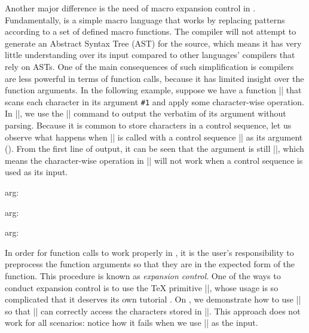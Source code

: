 \documentclass{ltugboat}
\begin{document}
Another major difference is the need of macro expansion control in \LT{}.
Fundamentally, \LT{} is a simple macro language that works by replacing patterns according to a set of defined macro functions.
The \LT{} compiler will not attempt to generate an Abstract Syntax Tree (AST) for the \LT{} source, which means it has very little understanding over its input compared to other languages' compilers that rely on ASTs.
One of the main consequences of such simplification is \LT{} compilers are less powerful in terms of function calls, because it has limited insight over the function arguments.
In the following example, suppose we have a function \inltex|\cmda| that scans each character in its argument \verb|#1| and apply some character-wise operation. 
In \inltex|\cmda|, we use the \inltex|\detokenize| command to output the verbatim of its argument without parsing.
Because it is common to store characters in a control sequence, let us observe what happens when \inltex|\cmda| is called with a control sequence \inltex|\vala| as its argument ().
From the first line of output, it can be seen that the argument is still \inltex|\vala|, which means the character-wise operation in \inltex|\cmda| will not work when a control sequence is used as its input.
\begin{latexsample}[examplelabel=ex:trad-expan-ctrl,exampletitle={Expansion Control},noexport]
\def\cmda#1{%
  arg: \detokenize{#1} %
}
\def\vala{val-a}
\def\valb{\vala}
\par\cmda{\vala}
\par\expandafter\expandafter\expandafter\cmda\expandafter{\vala}
\par\expandafter\expandafter\expandafter\cmda\expandafter{\valb}
\end{latexsample}
\noindent In order for function calls to work properly in \LT{}, it is the user's responsibility to preprocess the function arguments so that they are in the expected form of the function.
This procedure is known as \emph{expansion control}.
One of the ways to conduct expansion control is to use the \TeX{} primitive \inltex|\expandafter|, whose usage is so complicated that it deserves its own tutorial \cite{bechtolsheim1988tutorial}.
On , we demonstrate how to use \inltex|\expandafter| so that \inltex|\cmda| can correctly access the characters stored in \inltex|\vala|.
This approach does not work for all scenarios: notice how it fails when we use \inltex|\valb| as the input.
\end{document}
